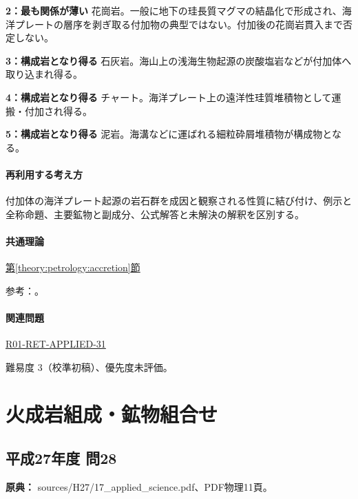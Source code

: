 \noindent\textbf{2：最も関係が薄い} 花崗岩。一般に地下の珪長質マグマの結晶化で形成され、海洋プレートの層序を剥ぎ取る付加物の典型ではない。付加後の花崗岩貫入まで否定しない。\par

\noindent\textbf{3：構成岩となり得る} 石灰岩。海山上の浅海生物起源の炭酸塩岩などが付加体へ取り込まれ得る。\par

\noindent\textbf{4：構成岩となり得る} チャート。海洋プレート上の遠洋性珪質堆積物として運搬・付加され得る。\par

\noindent\textbf{5：構成岩となり得る} 泥岩。海溝などに運ばれる細粒砕屑堆積物が構成物となる。\par

\paragraph{再利用する考え方} 付加体の海洋プレート起源の岩石群を成因と観察される性質に結び付け、例示と全称命題、主要鉱物と副成分、公式解答と未解決の解釈を区別する。

\paragraph{共通理論} \hyperref[theory:petrology:accretion]{第\ref*{theory:petrology:accretion}節}

\par 参考：\cite{aist_accretion2026,gsj_saganoseki1993}。

\paragraph{関連問題} \hyperref[q:r01-ret-applied-31]{R01-RET-APPLIED-31}

\par 難易度 3（校準初稿）、優先度未評価。

\section{火成岩組成・鉱物組合せ}

\subsection{平成27年度 問28}
\label{q:h27-reg-applied-28}

\noindent\textbf{原典：} sources/H27/17\_applied\_science.pdf、PDF物理11頁。

